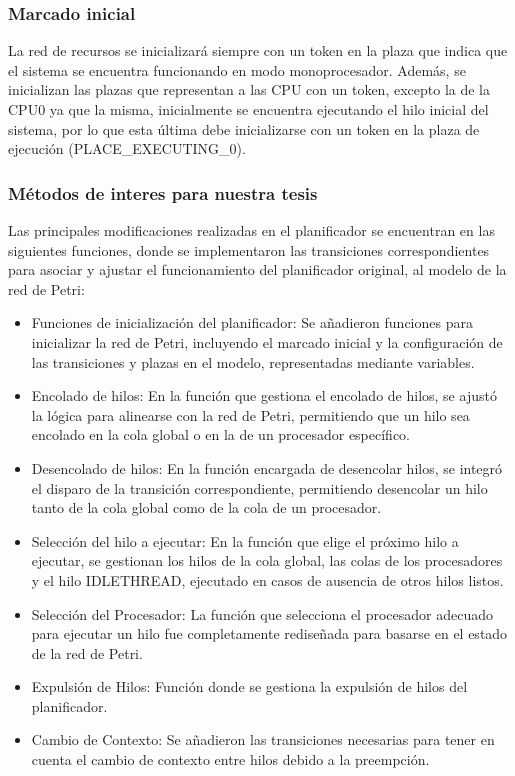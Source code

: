 \subsubsection{Marcado inicial}
La red de recursos se inicializará siempre con un token en la plaza que indica que el sistema se encuentra funcionando en modo monoprocesador. Además, se inicializan las plazas que representan a las CPU con un token, excepto la de la CPU0 ya que la misma, inicialmente se encuentra ejecutando el hilo inicial del sistema, por lo que esta última debe inicializarse con un token en la plaza de ejecución (PLACE\_EXECUTING\_0).



\subsubsection{Métodos de interes para nuestra tesis}

Las principales modificaciones realizadas en el planificador se encuentran en las siguientes funciones, donde se implementaron las transiciones correspondientes para asociar y ajustar el funcionamiento del planificador original, al modelo de la red de Petri:

\begin{itemize}
    \item Funciones de inicialización del planificador: Se añadieron funciones para inicializar la red de Petri, incluyendo el marcado inicial y la configuración de las transiciones y plazas en el modelo, representadas mediante variables.
    \item Encolado de hilos: En la función que gestiona el encolado de hilos, se ajustó la lógica para alinearse con la red de Petri, permitiendo que un hilo sea encolado en la cola global o en la de un procesador específico.
    \item Desencolado de hilos: En la función encargada de desencolar hilos, se integró el disparo de la transición correspondiente, permitiendo desencolar un hilo tanto de la cola global como de la cola de un procesador.
    \item Selección del hilo a ejecutar: En la función que elige el próximo hilo a ejecutar, se gestionan los hilos de la cola global, las colas de los procesadores y el hilo IDLETHREAD, ejecutado en casos de ausencia de otros hilos listos.
    \item Selección del Procesador: La función que selecciona el procesador adecuado para ejecutar un hilo fue completamente rediseñada para basarse en el estado de la red de Petri.
    \item Expulsión de Hilos: Función donde se gestiona la expulsión de hilos del planificador.
    \item Cambio de Contexto: Se añadieron las transiciones necesarias para tener en cuenta el cambio de contexto entre hilos debido a la preempción.
\end{itemize}
